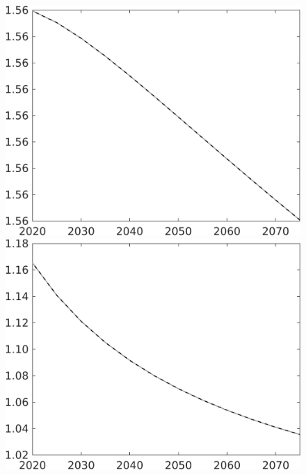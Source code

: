 \documentclass[12pt]{article}
\begin{document}
\begin{figure}[h!!]
\begin{minipage}[]{0.32\textwidth}
	\end{minipage}	
	\begin{minipage}[]{0.32\textwidth}
		\includegraphics[width=1\textwidth]{../../codding_model/own_basedOnFried/optimalPol_010922_revision/figures/all_13Sept22/CompTaul_LFBAU_Reg0_pn_spillover0_nsk1_xgr0_knspil0_sep1_countec0_GovRev0_etaa0.79_lgd0.png}
	\end{minipage}	
	\begin{minipage}[]{0.32\textwidth}
		\includegraphics[width=1\textwidth]{../../codding_model/own_basedOnFried/optimalPol_010922_revision/figures/all_13Sept22/CompTaul_LFBAU_Reg0_pg_spillover0_nsk1_xgr0_knspil0_sep1_countec0_GovRev0_etaa0.79_lgd0.png}

\end{minipage}
\end{figure}
\end{document}
